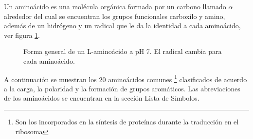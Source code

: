 Un amino\'{a}cido es una mol\'{e}cula org\'{a}nica formada por un carbono llamado $\alpha$ alrededor del cual se encuentran los grupos funcionales carboxilo y amino, adem\'{a}s de un hidr\'{o}geno y un radical que le da la identidad a cada amino\'{a}cido, ver figura \ref{fig:amino}.\\
\begin{figure}[H]
\centering
{}
\caption{Forma general de un L-amino\'{a}cido a pH 7. El radical  cambia para cada amino\'{a}cido.}\label{fig:amino}
\end{figure}
A continuaci\'{o}n se muestran los 20 amino\'{a}cidos comunes \footnote{Son los incorporados en la s\'{i}ntesis de prote\'{i}nas durante la traducci\'{o}n en el ribosoma}  clasificados de acuerdo a la carga, la polaridad y la formaci\'{o}n de grupos arom\'{a}ticos. Las abreviaciones de los amino\'{a}cidos se encuentran en la secci\'{o}n Lista de S\'{i}mbolos.\\
